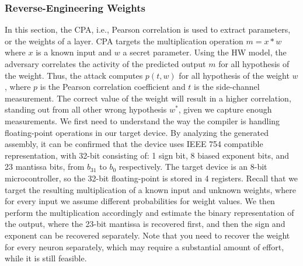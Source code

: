 \subsubsection{Reverse-Engineering Weights}
In this section, the CPA, i.e., Pearson correlation is used to extract parameters, or the weights of a layer.
CPA targets the multiplication operation $m=x*w$ where $x$ is a known input and $w$ a secret parameter.
Using the HW model, the adversary correlates the activity of the predicted output $m$ for all hypothesis of the weight.
Thus, the attack computes $p(t, w)$ for all hypothesis of the weight $w$, where $p$ is the Pearson correlation coefficient and $t$ is the side-channel measurement.
The correct value of the weight will result in a higher correlation, standing out from all other wrong hypothesis $w^*$, given we capture enough measurements.
We first need to understand the way the compiler is handling floating-point operations in our target device.
By analyzing the generated assembly, it can be confirmed that the device uses IEEE 754 compatible representation, with 32-bit consisting of: 1 sign bit, 8 biased exponent bits, and 23 mantissa bits, from $b_31$ to $b_0$ respectively.
The target device is an 8-bit microcontroller, so the 32-bit floating-point is stored in 4 registers.
Recall that we target the resulting multiplication of a known input and unknown weights, where for every input we assume different probabilities for weight values.
We then perform the multiplication accordingly and estimate the binary representation of the output, where the 23-bit mantissa is recovered first, and then the sign and exponent can be recovered separately.
Note that you need to recover the weight for every neuron separately, which may require a substantial amount of effort, while it is still feasible.

